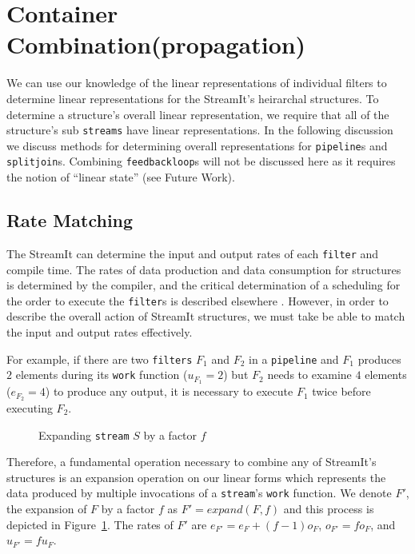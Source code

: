 \section{Container Combination(propagation)}
We can use our knowledge of the linear representations of individual filters
to determine linear representations for the StreamIt's heirarchal structures.
To determine a structure's overall linear representation, we require that all 
of the structure's sub {\tt streams} have linear representations. 
In the following discussion we discuss methods for determining overall representations for 
{\tt pipeline}s and {\tt splitjoin}s. Combining {\tt feedbackloop}s will not be discussed
here as it requires the notion of ``linear state'' (see Future Work).



\subsection{Rate Matching}
The StreamIt can determine the input and output rates of each {\tt filter} and compile
time. The rates of data production and data consumption for structures is determined 
by the compiler, and the critical determination of a scheduling for the order to execute 
the {\tt filter}s is described elsewhere \cite{karczma-thesis}. However,  
in order to describe the overall action of StreamIt structures, we must take
be able to match the input and output rates effectively. 

For example, if there are two {\tt filters} $F_1$ and $F_2$ in 
a {\tt pipeline} and $F_1$ produces $2$ elements 
during its {\tt work} function ($u_{F_1}=2$) but $F_2$ needs to examine $4$ elements 
($e_{F_2}=4$) to produce any output, it is necessary to execute $F_1$
twice before executing $F_2$. 

\begin{figure}
\center
\epsfxsize=3.0in
\caption{Expanding {\tt stream} $S$ by a factor $f$}
\label{fig:expanding-a-filter}
\vspace{-12pt}
\end{figure}

Therefore, a fundamental operation necessary to combine any of StreamIt's structures is 
an expansion operation on our linear forms which represents the data produced
by multiple invocations of a {\tt stream}'s {\tt work} function.
We denote $F'$, the expansion of $F$ by a factor $f$ as $F' = expand(F, f)$
and this process is depicted in Figure~\ref{fig:expanding-a-filter}.
The rates of $F'$ are $e_{F'}=e_F + (f-1)o_F$, $o_{F'}=fo_F$, and $u_{F'}=fu_F$.

